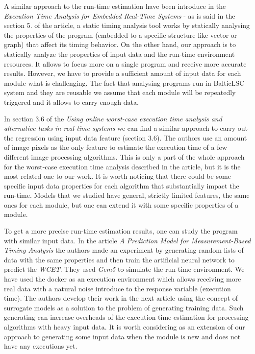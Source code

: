 A similar approach to the run-time estimation have been introduce in the \textit{Execution Time Analysis for Embedded Real-Time Systems}\cite{time-analysis} - as is said in the section 5. of the article, a static timing  analysis tool works by statically analysing the properties of the program (embedded to a specific structure like vector or graph) that affect its timing behavior. On the other hand, our approach is to statically analyze the properties of input data and the run-time environment resources. It allows to focus more on a single program and receive more accurate results. However, we have to provide a sufficient amount of input data for each module what is challenging. The fact that analysing programs run in BalticLSC system and they are reusable we assume that each module will be repeatedly triggered and it allows to carry enough data.  

In section 3.6 of the \textit{Using online worst-case execution time analysis and alternative tasks in real-time systems}\cite{images-processing-time} we can find a similar approach to carry out the regression using input data feature (section 3.6). The authors use an amount of image pixels as the only feature to estimate the execution time of a few different image processing algorithms. This is only a part of the whole approach for the worst-case execution time analysis described in the article, but it is the most related one to our work. It is worth noticing that there could be some specific input data properties for each algorithm that substantially impact the run-time. Models that we studied have general, strictly limited features, the same ones for each module, but one can extend it with some specific properties of a module.

To get a more precise run-time estimation results, one can study the program with similar input data. In the article \textit{A Prediction Model for Measurement-Based Timing Analysis}\cite{ga} the authors made an experiment by generating random lists of data with the same properties and then train the artificial neural network to predict the \textit{WCET}. They used \textit{Gem5} to simulate the run-time environment. We have used the docker as an execution environment which allows receiving more real data with a natural noise introduce to the response variable (execution time). The authors develop their work in the next article\cite{surogate} using the concept of surrogate models as a solution to the problem of generating training data. Such generating can increase overheads of the execution time estimation for processing algorithms with heavy input data. It is worth considering as an extension of our approach to generating some input data when the module is new and does not have any executions yet.

